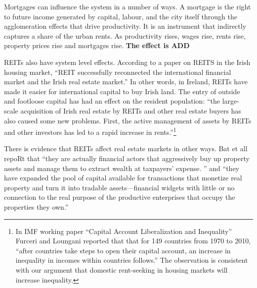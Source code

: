 Mortgages can influence the system in a number of ways. %
A mortgage is the right to future income generated by capital, labour, and the city itself through the agglomeration effects that drive productivity. It is an instrument that indirectly captures a share of the urban rents. As productivity rises, wages rise, rents rise, property prices rise and mortgages rise. \textbf{The effect is ADD}

REITs also have system level effects. %
According to a paper \cite{wangAnalyzeImpactREITs2021} on REITS in the Irish housing market, ``REIT successfully reconnected the international financial market and the Irish real estate market.'' In other words, in Ireland, REITs have made it easier for international capital to buy Irish land. The entry of outside and footloose capital has had an effect on the resident population:  ``the large-scale acquisition of Irish real estate by REITs and other real estate buyers has also caused some new problems. First, the active management of assets by REITs and other investors has led to a rapid increase in rents.''\footnote{In  IMF working paper ``Capital Account Liberalization and Inequality'' \cite{furceriCapitalAccountLiberalization2015}  Furceri and Loungani reported that that for 149 countries from 1970 to 2010, ``after countries take steps to open their capital account, an increase in inequality in incomes within countries follows.'' The observation is consistent with our argument  that domestic \gls{rent-seeking} in housing markets will increase inequality.}  

There is evidence that REITs affect real estate markets in other ways. Bat et all  \cite{batRolePublicREITs2022} repoRt that  ``they are actually financial actors that aggressively buy up property assets and manage them to extract wealth at taxpayers’ expense. '' and ``they have expanded the pool of capital available for transactions that monetize real property and turn it into tradable assets---financial widgets with little or no connection to the real purpose of the productive enterprises that occupy the properties they own.''



